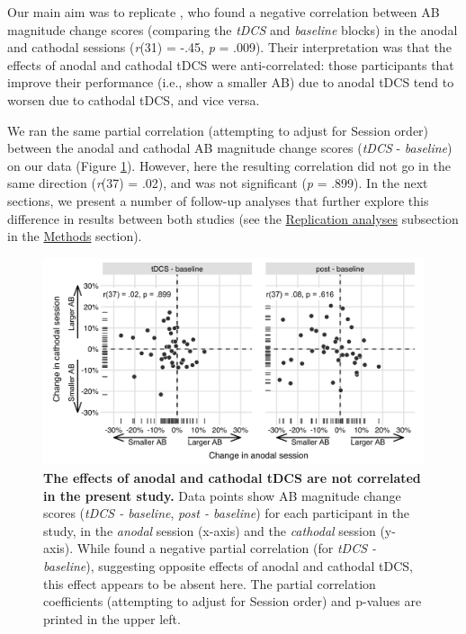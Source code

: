 \documentclass[11pt,english,]{memoir}
\begin{document}
Our main aim was to replicate \textcite{London2015}, who found a negative correlation between AB magnitude change scores (comparing the \emph{tDCS} and \emph{baseline} blocks) in the anodal and cathodal sessions (\emph{r}(31) = -.45, \emph{p} = .009). Their interpretation was that the effects of anodal and cathodal tDCS were anti-correlated: those participants that improve their performance (i.e., show a smaller AB) due to anodal tDCS tend to worsen due to cathodal tDCS, and vice versa.

We ran the same partial correlation (attempting to adjust for Session order) between the anodal and cathodal AB magnitude change scores (\emph{tDCS} - \emph{baseline}) on our data (Figure \ref{fig:fig-corr}). However, here the resulting correlation did not go in the same direction (\emph{r}(37) = .02), and was not significant (\emph{p} = .899). In the next sections, we present a number of follow-up analyses that further explore this difference in results between both studies (see the \protect\hyperlink{AB_tDCS-rep-analyses}{Replication analyses} subsection in the \protect\hyperlink{AB_tDCS-methods}{Methods} section).

\begin{figure}
\includegraphics[width=130mm]{AB_tDCS_files/figures/figure_4_corr} \caption{\textbf{The effects of anodal and cathodal tDCS are not correlated in the present study.} Data points show AB magnitude change scores (\emph{tDCS - baseline}, \emph{post - baseline}) for each participant in the study, in the \emph{anodal} session (x-axis) and the \emph{cathodal} session (y-axis). While \textcite{London2015} found a negative partial correlation (for \emph{tDCS - baseline}), suggesting opposite effects of anodal and cathodal tDCS, this effect appears to be absent here. The partial correlation coefficients (attempting to adjust for Session order) and p-values are printed in the upper left.}\label{fig:fig-corr}
\end{figure}
\end{document}
